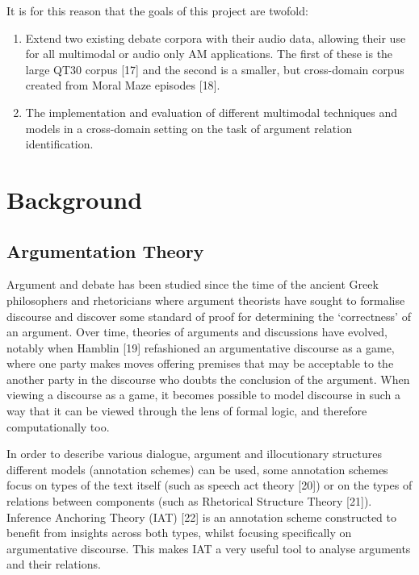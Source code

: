 \documentclass[twocolumn]{article}
\providecommand{\tightlist}{%
  \setlength{\itemsep}{0pt}\setlength{\parskip}{0pt}}
\begin{document}
It is for this reason that the goals of this project are twofold:

\begin{enumerate}
\def\labelenumi{(\roman{enumi})}
\tightlist
\item
  Extend two existing debate corpora with their audio data, allowing
  their use for all multimodal or audio only AM applications. The first
  of these is the large QT30 corpus {[}17{]} and the second is a
  smaller, but cross-domain corpus created from Moral Maze episodes
  {[}18{]}.
\item
  The implementation and evaluation of different multimodal techniques
  and models in a cross-domain setting on the task of argument relation
  identification.
\end{enumerate}

\section{Background}\label{background}

\subsection{Argumentation Theory}\label{argumentation-theory}

Argument and debate has been studied since the time of the ancient Greek
philosophers and rhetoricians where argument theorists have sought to
formalise discourse and discover some standard of proof for determining
the `correctness' of an argument. Over time, theories of arguments and
discussions have evolved, notably when Hamblin {[}19{]} refashioned an
argumentative discourse as a game, where one party makes moves offering
premises that may be acceptable to the another party in the discourse
who doubts the conclusion of the argument. When viewing a discourse as a
game, it becomes possible to model discourse in such a way that it can
be viewed through the lens of formal logic, and therefore
computationally too.

In order to describe various dialogue, argument and illocutionary
structures different models (annotation schemes) can be used, some
annotation schemes focus on types of the text itself (such as speech act
theory {[}20{]}) or on the types of relations between components (such
as Rhetorical Structure Theory {[}21{]}). Inference Anchoring Theory
(IAT) {[}22{]} is an annotation scheme constructed to benefit from
insights across both types, whilst focusing specifically on
argumentative discourse. This makes IAT a very useful tool to analyse
arguments and their relations.
\end{document}
